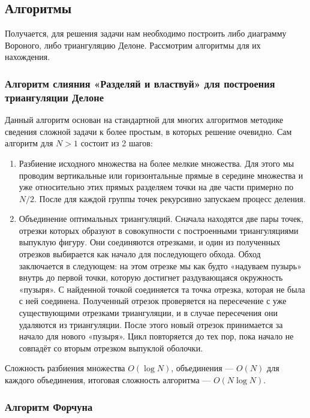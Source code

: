 \newpage

\subsection{Алгоритмы}

Получается, для решения задачи нам необходимо построить либо диаграмму Вороного, либо триангуляцию Делоне. Рассмотрим алгоритмы для их нахождения.

\subsubsection*{Алгоритм слияния «Разделяй и властвуй» для построения триангуляции Делоне}

Данный алгоритм основан на стандартной для многих алгоритмов методике сведения сложной задачи к более простым, в которых решение очевидно. Сам алгоритм для $N>1$ состоит из 2 шагов:

\begin{enumerate}
    \item Разбиение исходного множества на более мелкие множества. Для этого мы проводим вертикальные или горизонтальные прямые в середине множества и уже относительно этих прямых разделяем точки на две части примерно по $N/2$. После для каждой группы точек рекурсивно запускаем процесс деления.
    \item Объединение оптимальных триангуляций. Сначала находятся две пары точек, отрезки которых образуют в совокупности с построенными триангуляциями выпуклую фигуру. Они соединяются отрезками, и один из полученных отрезков выбирается как начало для последующего обхода. Обход заключается в следующем: на этом отрезке мы как будто «надуваем пузырь» внутрь до первой точки, которую достигнет раздувающаяся окружность «пузыря». С найденной точкой соединяется та точка отрезка, которая не была с ней соединена. Полученный отрезок проверяется на пересечение с уже существующими отрезками триангуляции, и в случае пересечения они удаляются из триангуляции. После этого новый отрезок принимается за начало для нового «пузыря». Цикл повторяется до тех пор, пока начало не совпадёт со вторым отрезком выпуклой оболочки.
\end{enumerate}

Сложность разбиения множества $O(\log N)$, объединения —
$O(N)$ для каждого объединения, итоговая сложность алгоритма —
$O(N \log N)$.

\subsubsection*{Алгоритм Форчуна}


